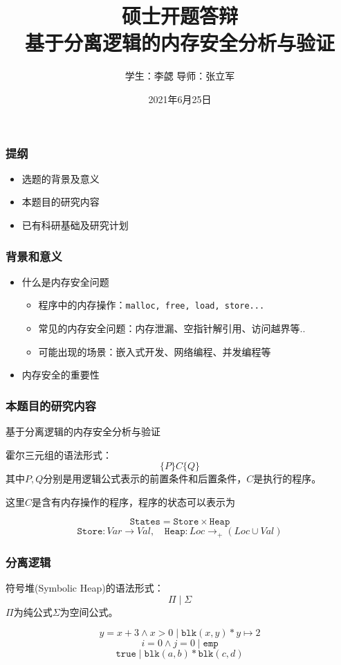 \documentclass[11pt]{beamer}
\title{硕士开题答辩\\基于分离逻辑的内存安全分析与验证}
\date{2021年6月25日}
\author{学生：李勰 \qquad 导师：张立军}
\begin{document}
\maketitle

\begin{frame}\frametitle{提纲}
\begin{itemize}
\item 选题的背景及意义
\item 本题目的研究内容
\item 已有科研基础及研究计划
\end{itemize}
\end{frame}
\begin{frame}\frametitle{背景和意义}
\begin{itemize}
\item 什么是内存安全问题

\begin{itemize}
\item 程序中的内存操作：\texttt{malloc, free, load, store...}
\item 
常见的内存安全问题：内存泄漏、空指针解引用、访问越界等..
\item 可能出现的场景：嵌入式开发、网络编程、并发编程等
\end{itemize}


\item 内存安全的重要性

\end{itemize}
\end{frame}

\begin{frame}\frametitle{本题目的研究内容}
\begin{center}
基于分离逻辑的内存安全分析与验证
\end{center}
\pause

\begin{definition}[霍尔三元组]
霍尔三元组的语法形式：
\[\{P\}C\{Q\}\]
其中$P,Q$分别是用逻辑公式表示的前置条件和后置条件，$C$是执行的程序。
\end{definition}

\pause
这里$C$是含有内存操作的程序，程序的状态可以表示为

\[\texttt{States} = \texttt{Store}\times \texttt{Heap}\]
\[\texttt{Store}: Var \rightarrow Val, \quad \texttt{Heap}: Loc \rightarrow_+ (Loc \cup Val)\]


\end{frame}

\begin{frame}\frametitle{分离逻辑}
\begin{definition}[符号堆]
符号堆(Symbolic Heap)的语法形式：
\[\Pi \mid \Sigma \]
$\Pi$为纯公式$\Sigma$为空间公式。
\end{definition}
\begin{example}
\[ y = x + 3 \wedge x > 0 \mid \texttt{blk}(x, y)* y\mapsto 2\]
\[ i = 0\wedge j = 0 \mid \texttt{emp}\]
\[\texttt{true}\mid \texttt{blk}(a,b) * \texttt{blk}(c,d)\]
\end{example}
\end{frame}
\end{document}
